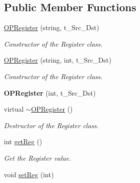 \subsection*{Public Member Functions}
\begin{DoxyCompactItemize}
\item 
\hypertarget{classOPRegister_a896eb65f36bf615ccfa74541de23858f}{
\hyperlink{classOPRegister_a896eb65f36bf615ccfa74541de23858f}{OPRegister} (string, t\_\-Src\_\-Dst)}
\label{classOPRegister_a896eb65f36bf615ccfa74541de23858f}

\begin{DoxyCompactList}\small\item\em Constructor of the Register class. \item\end{DoxyCompactList}\item 
\hypertarget{classOPRegister_ad75c23d1db7c149c20cbc8bb01c6df59}{
\hyperlink{classOPRegister_ad75c23d1db7c149c20cbc8bb01c6df59}{OPRegister} (string, int, t\_\-Src\_\-Dst)}
\label{classOPRegister_ad75c23d1db7c149c20cbc8bb01c6df59}

\begin{DoxyCompactList}\small\item\em Constructor of the Register class. \item\end{DoxyCompactList}\item 
\hypertarget{classOPRegister_a3c9786680764ada47370d469790b8178}{
{\bfseries OPRegister} (int, t\_\-Src\_\-Dst)}
\label{classOPRegister_a3c9786680764ada47370d469790b8178}

\item 
\hypertarget{classOPRegister_aedab3bc5a2eecd0d02771fb6b37d73fe}{
virtual \hyperlink{classOPRegister_aedab3bc5a2eecd0d02771fb6b37d73fe}{$\sim$OPRegister} ()}
\label{classOPRegister_aedab3bc5a2eecd0d02771fb6b37d73fe}

\begin{DoxyCompactList}\small\item\em Destructor of the Register class. \item\end{DoxyCompactList}\item 
int \hyperlink{classOPRegister_af409289a33aff7c3d0469d748aeacd15}{getReg} ()
\begin{DoxyCompactList}\small\item\em Get the Register value. \item\end{DoxyCompactList}\item 
\hypertarget{classOPRegister_a2e9b7e1d1b23360357573c95dc89e35b}{
void \hyperlink{classOPRegister_a2e9b7e1d1b23360357573c95dc89e35b}{setReg} (int)}
\label{classOPRegister_a2e9b7e1d1b23360357573c95dc89e35b}


\end{DoxyCompactItemize}
